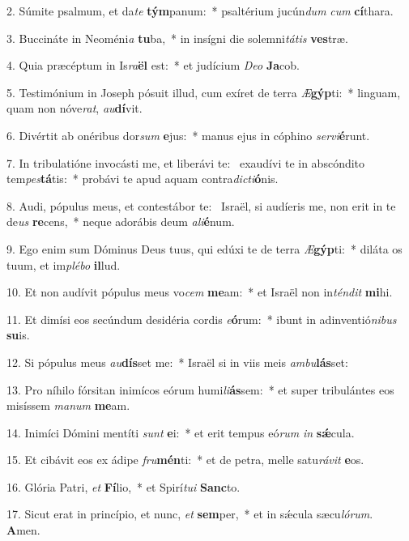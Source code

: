 2. Súmite psalmum, et da\textit{te} \textbf{tým}panum:~*  psaltérium jucún\textit{dum} \textit{cum} \textbf{cí}thara.\

3. Buccináte in Neoméni\textit{a} \textbf{tu}ba,~*  in insígni die solemni\textit{tá}\textit{tis} \textbf{ves}træ.\

4. Quia præcéptum in Is\textit{ra}\textbf{ël} est:~*  et judícium \textit{De}\textit{o} \textbf{Ja}cob.\

5. Testimónium in Joseph pósuit illud, cum exíret de terra \textit{Æ}\textbf{gýp}ti:~*  linguam, quam non nóve\textit{rat}, \textit{au}\textbf{dí}vit.\

6. Divértit ab onéribus dor\textit{sum} \textbf{e}jus:~*  manus ejus in cóphino \textit{ser}\textit{vi}\textbf{é}runt.\

7. In tribulatióne invocásti me, et liberávi te: \dag\  exaudívi te in abscóndito tem\textit{pes}\textbf{tá}tis:~*  probávi te apud aquam contra\textit{dic}\textit{ti}\textbf{ó}nis.\

8. Audi, pópulus meus, et contestábor te: \dag\  Israël, si audíeris me, non erit in te de\textit{us} \textbf{re}cens,~*  neque adorábis deum \textit{a}\textit{li}\textbf{é}num.\

9. Ego enim sum Dóminus Deus tuus, qui edúxi te de terra \textit{Æ}\textbf{gýp}ti:~*  diláta os tuum, et im\textit{plé}\textit{bo} \textbf{il}lud.\

10. Et non audívit pópulus meus vo\textit{cem} \textbf{me}am:~*  et Israël non in\textit{tén}\textit{dit} \textbf{mi}hi.\

11. Et dimísi eos secúndum desidéria cordis \textit{e}\textbf{ó}rum:~*  ibunt in adinventió\textit{ni}\textit{bus} \textbf{su}is.\

12. Si pópulus meus \textit{au}\textbf{dís}set me:~*  Israël si in viis meis \textit{am}\textit{bu}\textbf{lás}set:\

13. Pro níhilo fórsitan inimícos eórum humi\textit{li}\textbf{ás}sem:~*  et super tribulántes eos misíssem \textit{ma}\textit{num} \textbf{me}am.\

14. Inimíci Dómini mentíti \textit{sunt} \textbf{e}i:~*  et erit tempus eó\textit{rum} \textit{in} \textbf{sǽ}cula.\

15. Et cibávit eos ex ádipe \textit{fru}\textbf{mén}ti:~*  et de petra, melle satu\textit{rá}\textit{vit} \textbf{e}os.\

16. Glória Patri, \textit{et} \textbf{Fí}lio,~*  et Spirí\textit{tu}\textit{i} \textbf{Sanc}to.\

17. Sicut erat in princípio, et nunc, \textit{et} \textbf{sem}per,~*  et in sǽcula sæcu\textit{ló}\textit{rum}. \textbf{A}men.\

